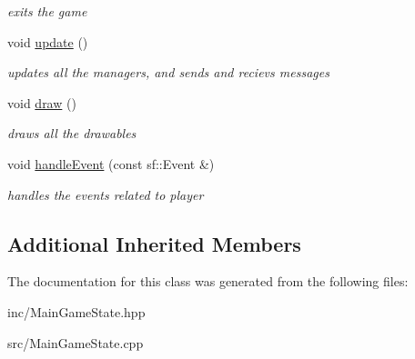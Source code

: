 \begin{DoxyCompactItemize}
\begin{DoxyCompactList}\small\item\em exits the game \end{DoxyCompactList}\item 
\hypertarget{class_main_game_state_a96bda298349f429bfc252736b95cdd27}{void \hyperlink{class_main_game_state_a96bda298349f429bfc252736b95cdd27}{update} ()}\label{class_main_game_state_a96bda298349f429bfc252736b95cdd27}

\begin{DoxyCompactList}\small\item\em updates all the managers, and sends and recievs messages \end{DoxyCompactList}\item 
\hypertarget{class_main_game_state_a0f58b64534021d2cb3cbbab82ea9b357}{void \hyperlink{class_main_game_state_a0f58b64534021d2cb3cbbab82ea9b357}{draw} ()}\label{class_main_game_state_a0f58b64534021d2cb3cbbab82ea9b357}

\begin{DoxyCompactList}\small\item\em draws all the drawables \end{DoxyCompactList}\item 
\hypertarget{class_main_game_state_a7144604c1c9bc3d9a2f152cd74d11f6e}{void \hyperlink{class_main_game_state_a7144604c1c9bc3d9a2f152cd74d11f6e}{handle\+Event} (const sf\+::\+Event \&)}\label{class_main_game_state_a7144604c1c9bc3d9a2f152cd74d11f6e}

\begin{DoxyCompactList}\small\item\em handles the events related to player \end{DoxyCompactList}\end{DoxyCompactItemize}
\subsection*{Additional Inherited Members}


The documentation for this class was generated from the following files\+:\begin{DoxyCompactItemize}
\item 
inc/Main\+Game\+State.\+hpp\item 
src/Main\+Game\+State.\+cpp\end{DoxyCompactItemize}
